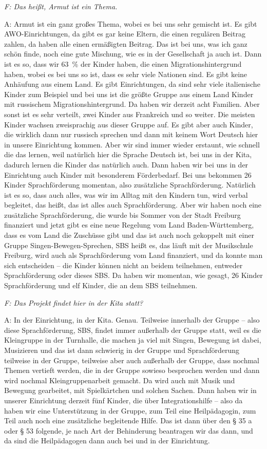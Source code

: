 \emph{F: Das heißt, Armut ist ein Thema.} 

A: Armut ist ein ganz großes Thema, wobei es bei uns sehr gemischt ist. Es gibt AWO-Einrichtungen, da gibt es gar keine Eltern, die einen regulären Beitrag zahlen, da haben alle einen ermäßigten Beitrag. Das ist bei uns, was ich ganz schön finde, noch eine gute Mischung, wie es in der Gesellschaft ja auch ist. Dann ist es so, dass wir 63~\% der Kinder haben, die einen Migrationshintergrund haben, wobei es bei uns so ist, dass es sehr viele Nationen sind. Es gibt keine Anhäufung aus einem Land. Es gibt Einrichtungen, da sind sehr viele italienische Kinder zum Beispiel und bei uns ist die größte Gruppe aus einem Land Kinder mit russischem Migrationshintergrund. Da haben wir derzeit acht Familien. Aber sonst ist es sehr verteilt, zwei Kinder aus Frankreich und so weiter. Die meisten Kinder wachsen zweisprachig aus dieser Gruppe auf. Es gibt aber auch Kinder, die wirklich dann nur russisch sprechen und dann mit keinem Wort Deutsch hier in unsere Einrichtung kommen. Aber wir sind immer wieder erstaunt, wie schnell die das lernen, weil natürlich hier die Sprache Deutsch ist, bei uns in der Kita, dadurch lernen die Kinder das natürlich auch. Dann haben wir bei uns in der Einrichtung auch Kinder mit besonderem Förderbedarf. Bei uns bekommen 26 Kinder Sprachförderung momentan, also zusätzliche Sprachförderung. Natürlich ist es so, dass auch alles, was wir im Alltag mit den Kindern tun, wird verbal begleitet, das heißt, das ist alles auch Sprachförderung. Aber wir haben noch eine zusätzliche Sprachförderung, die wurde bis Sommer von der Stadt Freiburg finanziert und jetzt gibt es eine neue Regelung vom Land Baden-Württemberg, dass es vom Land die Zuschüsse gibt und das ist auch noch gekoppelt mit einer Gruppe Singen-Bewegen-Sprechen, SBS heißt es, das läuft mit der Musikschule Freiburg, wird auch als Sprachförderung vom Land finanziert, und da konnte man sich entscheiden -- die Kinder können nicht an beidem teilnehmen, entweder Sprachförderung oder dieses SBS. Da haben wir momentan, wie gesagt, 26 Kinder Sprachförderung und elf Kinder, die an dem SBS teilnehmen.  

\emph{F: Das Projekt findet hier in der Kita statt?} 

A: In der Einrichtung, in der Kita. Genau. Teilweise innerhalb der Gruppe – also diese Sprachförderung, SBS, findet immer außerhalb der Gruppe statt, weil es die Kleingruppe in der Turnhalle, die machen ja viel mit Singen, Bewegung ist dabei, Musizieren und das ist dann schwierig in der Gruppe und Sprachförderung teilweise in der Gruppe, teilweise aber auch außerhalb der Gruppe, dass nochmal Themen vertieft werden, die in der Gruppe sowieso besprochen werden und dann wird nochmal Kleingruppenarbeit gemacht. Da wird auch mit Musik und Bewegung gearbeitet, mit Spielkärtchen und solchen Sachen. Dann haben wir in unserer Einrichtung derzeit fünf Kinder, die über Integrationshilfe -- also da haben wir eine Unterstützung in der Gruppe, zum Teil eine Heilpädagogin, zum Teil auch noch eine zusätzliche begleitende Hilfe. Das ist dann über den § 35 a oder § 53 folgende, je nach Art der Behinderung beantragen wir das dann, und da sind die Heilpädagogen dann auch bei und in der Einrichtung. 

